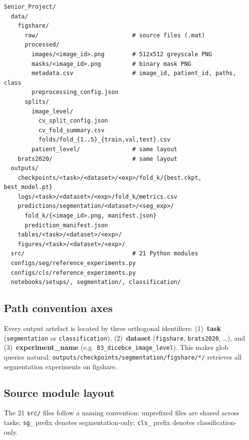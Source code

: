 \documentclass[12pt,a4paper]{article}
\begin{document}
\begin{lstlisting}[language={}, caption={Canonical directory tree (abbreviated).}]
Senior_Project/
  data/
    figshare/
      raw/                           # source files (.mat)
      processed/
        images/<image_id>.png        # 512x512 greyscale PNG
        masks/<image_id>.png         # binary mask PNG
        metadata.csv                 # image_id, patient_id, paths, class
        preprocessing_config.json
      splits/
        image_level/
          cv_split_config.json
          cv_fold_summary.csv
          folds/fold_{1..5}_{train,val,test}.csv
        patient_level/               # same layout
    brats2020/                       # same layout
  outputs/
    checkpoints/<task>/<dataset>/<exp>/fold_k/{best.ckpt, best_model.pt}
    logs/<task>/<dataset>/<exp>/fold_k/metrics.csv
    predictions/segmentation/<dataset>/<seg_exp>/
      fold_k/{<image_id>.png, manifest.json}
      prediction_manifest.json
    tables/<task>/<dataset>/<exp>/
    figures/<task>/<dataset>/<exp>/
  src/                               # 21 Python modules
  configs/seg/reference_experiments.py
  configs/cls/reference_experiments.py
  notebooks/setups/, segmentation/, classification/
\end{lstlisting}

\subsection{Path convention axes}

Every output artefact is located by three orthogonal identifiers:
(1)~\textbf{task} (\texttt{segmentation} or \texttt{classification}),
(2)~\textbf{dataset} (\texttt{figshare}, \texttt{brats2020}, \ldots), and
(3)~\textbf{experiment\_name} (e.g.\ \texttt{03\_dicebce\_image\_level}).
This makes glob queries natural:
\texttt{outputs/checkpoints/segmentation/figshare/*/} retrieves all segmentation
experiments on figshare.

\subsection{Source module layout}

The 21 \texttt{src/} files follow a naming convention: unprefixed files are
shared across tasks; \texttt{sg\_} prefix denotes segmentation-only; \texttt{cls\_}
prefix denotes classification-only.
\end{document}
